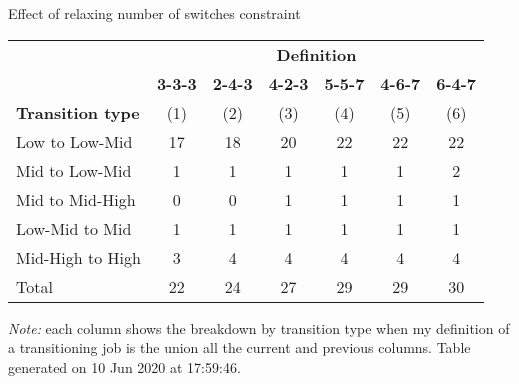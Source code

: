 \begin{center}
\begin{threeparttable}[!h]
\caption{Effect of relaxing number of switches constraint}
\begin{tabular}{lcccccc}
\toprule
\toprule
& \multicolumn{6}{c}{\textbf{Definition}} \\
\cline{2-7}
&\multicolumn{1}{c}{\textbf{3-3-3}}&\multicolumn{1}{c}{\textbf{2-4-3}}&\multicolumn{1}{c}{\textbf{4-2-3}}&\multicolumn{1}{c}{\textbf{5-5-7}}&\multicolumn{1}{c}{\textbf{4-6-7}}&\multicolumn{1}{c}{\textbf{6-4-7}} \\
\textbf{Transition type}&\multicolumn{1}{c}{(1)}&\multicolumn{1}{c}{(2)}&\multicolumn{1}{c}{(3)}&\multicolumn{1}{c}{(4)}&\multicolumn{1}{c}{(5)}&\multicolumn{1}{c}{(6)} \\
\midrule
\midrule
Low to Low-Mid&17&18&20&22&22&22 \\
Mid to Low-Mid&1&1&1&1&1&2 \\
Mid to Mid-High&0&0&1&1&1&1 \\
Low-Mid to Mid&1&1&1&1&1&1 \\
Mid-High to High&3&4&4&4&4&4 \\
Total&22&24&27&29&29&30 \\
\bottomrule
\bottomrule
\end{tabular}
\begin{tablenotes}
\item \footnotesize \textit{Note:} each column shows the breakdown by transition type when my definition of a transitioning job is the union all the current and previous columns. Table generated on 10 Jun 2020 at 17:59:46.
\end{tablenotes}
\end{threeparttable}
\end{center}
